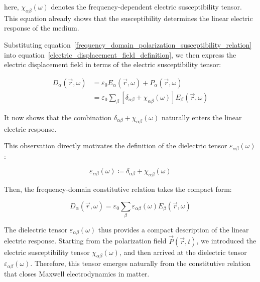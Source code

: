 here, $\chi_{\alpha\beta}(\omega)$ denotes the frequency-dependent electric susceptibility tensor.
This equation already shows that the susceptibility determines the linear electric response of the medium.

Substituting equation~\eqref{frequency_domain_polarization_susceptibility_relation} into equation~\eqref{electric_displacement_field_definition},
we then express the electric displacement field in terms of the electric susceptibility tensor:

\begin{equation}
\begin{aligned}
    D_\alpha(\vec{r},\omega)
    &=\varepsilon_0 E_\alpha(\vec{r},\omega)+P_\alpha(\vec{r},\omega) \\
    &=\varepsilon_0\sum_\beta\left[\delta_{\alpha\beta}+\chi_{\alpha\beta}(\omega)\right]E_\beta(\vec{r},\omega)
\end{aligned}
\label{electric_displacement_from_susceptibility}
\end{equation}

It now shows that the combination $\delta_{\alpha\beta}+\chi_{\alpha\beta}(\omega)$ naturally enters the linear electric response.

This observation directly motivates the definition of the dielectric tensor $\varepsilon_{\alpha\beta}(\omega)$:

\begin{equation}
    \varepsilon_{\alpha\beta}(\omega)
    \coloneqq\delta_{\alpha\beta}+\chi_{\alpha\beta}(\omega)
\label{dielectric_tensor_definition}
\end{equation}

Then, the frequency-domain constitutive relation takes the compact form:

\begin{equation}
    D_\alpha(\vec{r},\omega)
    = \varepsilon_0\sum_\beta\varepsilon_{\alpha\beta}(\omega)E_\beta(\vec{r},\omega)
\label{frequency_domain_constitutive_relation_with_dielectric_tensor}
\end{equation}

The dielectric tensor $\varepsilon_{\alpha\beta}(\omega)$ thus provides a compact description of the linear electric response.
Starting from the polarization field $\vec{P}(\vec{r},t)$,
we introduced the electric susceptibility tensor $\chi_{\alpha\beta}(\omega)$,
and then arrived at the dielectric tensor $\varepsilon_{\alpha\beta}(\omega)$.
Therefore, this tensor emerges naturally from the constitutive relation that closes Maxwell electrodynamics in matter.

